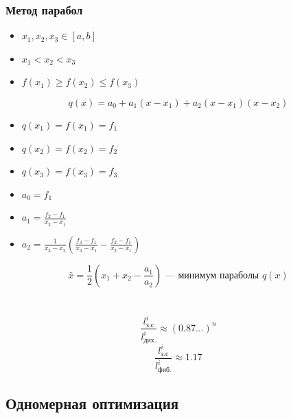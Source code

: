\documentclass[oneside]{book}
\theoremstyle{plain}
\theoremstyle{remark}
\theoremstyle{definition}
\begin{document}
\subsection{Метод парабол}
\label{sec:orga4e3892}
\begin{itemize}
\item \(x_1, x_2, x_3 \in [a, b]\)
\item \(x_1 < x_2 < x_3\)
\item \(f(x_1) \ge f(x_2) \le f(x_3)\)
\end{itemize}
\[ q(x) = a_0 + a_1(x - x_1) + a_2(x - x_1)(x - x_2) \]
\begin{itemize}
\item \(q(x_1) = f(x_1) = f_1\)
\item \(q(x_2) = f(x_2) = f_2\)
\item \(q(x_3) = f(x_3) = f_3\)
\end{itemize}


\begin{itemize}
\item \(a_0 = f_1\)
\item \(a_1 = \frac{f_2 - f_1}{x_2 - x_1}\)
\item \(a_2 = \frac{1}{x_3 - x_2}\left(\frac{f_3 - f_1}{x_3 - x_1} - \frac{f_2 - f_1}{x_2 - x_1}\right)\)
\end{itemize}
\[ \bar{x} = \frac{1}{2}\left(x_1 + x_2 - \frac{a_1}{a_2}\right)\text{ --- минимум параболы } q(x) \]
\chapter{}
\label{sec:orgf8b6a29}
\[ \frac{l_\text{з.с}^i}{l_\text{дих.}^i} \approx (0.87\dots)^n \] \[
\frac{l_\text{з.с}^i}{l_\text{фиб.}^i} \approx 1.17 \]

\section{Одномерная оптимизация}
\label{sec:org3066a8f}
\end{document}
